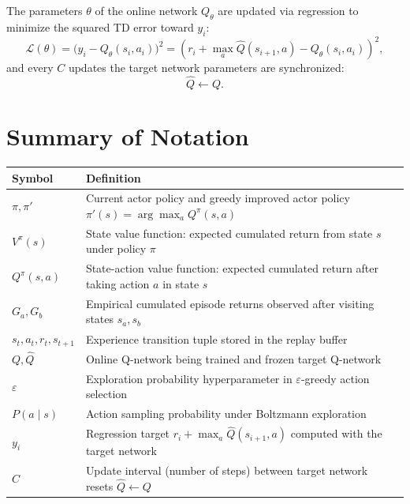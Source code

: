 \documentclass[11pt, a4paper]{article}
\begin{document}
The parameters $\theta$ of the online network $Q_\theta$ are updated via regression to minimize the squared TD error toward $y_i$:
\begin{equation}\label{eq:q-dqn-loss}
    \mathcal{L}(\theta) = \big(y_i - Q_\theta(s_i, a_i)\big)^2 = \left(r_i + \max_a \hat{Q}(s_{i+1}, a) - Q_\theta(s_i, a_i)\right)^2,
\end{equation}
and every $C$ updates the target network parameters are synchronized:
\begin{equation}\label{eq:q-target-network-update}
    \hat{Q} \leftarrow Q.
\end{equation}

\section{Summary of Notation}

\begin{table}[h!]
\centering
\begin{tabular}{@{}ll@{}}
\toprule
\textbf{Symbol} & \textbf{Definition} \\
\midrule
$\pi, \pi'$ & Current actor policy and greedy improved actor policy $\pi'(s) = \arg\max_a Q^\pi(s, a)$ \\
$V^\pi(s)$ & State value function: expected cumulated return from state $s$ under policy $\pi$ \\
$Q^\pi(s, a)$ & State-action value function: expected cumulated return after taking action $a$ in state $s$ \\
$G_a, G_b$ & Empirical cumulated episode returns observed after visiting states $s_a, s_b$ \\
$s_t, a_t, r_t, s_{t+1}$ & Experience transition tuple stored in the replay buffer \\
$Q, \hat{Q}$ & Online Q-network being trained and frozen target Q-network \\
$\varepsilon$ & Exploration probability hyperparameter in $\varepsilon$-greedy action selection \\
$P(a \mid s)$ & Action sampling probability under Boltzmann exploration \\
$y_i$ & Regression target $r_i + \max_a \hat{Q}(s_{i+1}, a)$ computed with the target network \\
$C$ & Update interval (number of steps) between target network resets $\hat{Q} \leftarrow Q$ \\
\bottomrule
\end{tabular}
\end{table}
\end{document}

